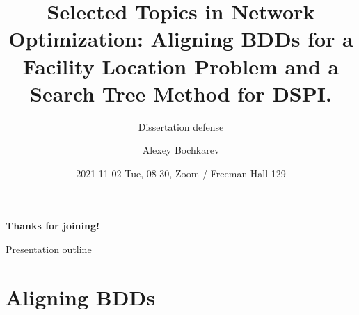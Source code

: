 \documentclass[10pt, xcolor=svgnames]{beamer}
\author{Alexey Bochkarev}
\date{2021-11-02 Tue, 08-30, Zoom / Freeman Hall 129}
\title{Selected Topics in Network Optimization: Aligning BDDs for a Facility Location Problem and a Search Tree Method for DSPI.}
\subtitle{Dissertation defense}
\begin{document}
\maketitle
{%
\begin{frame}[plain,b]
\centering
\LARGE \textbf{Thanks for joining!}\vspace{3.5ex}
\end{frame}
}%

\begin{frame}[label={sec:orgfc01ee9}]{Presentation outline}
\tableofcontents
\end{frame}

\section{Aligning BDDs}
\label{sec:org78bd9ae}
\end{document}
